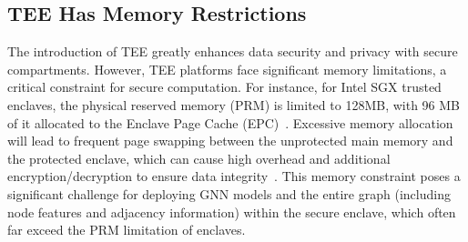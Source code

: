 \subsection{TEE Has Memory Restrictions} \label{ps: TEE}
The introduction of TEE greatly enhances data security and privacy with secure compartments. 
However, TEE platforms face significant memory limitations, a critical constraint for secure computation. 
For instance, for Intel SGX trusted enclaves, the physical reserved memory (PRM) is limited to 128MB, with 96 MB of it allocated to the Enclave Page Cache (EPC)~\cite{intel2017sgx}. 
Excessive memory allocation will lead to frequent page swapping between the unprotected main memory and the protected enclave, which can cause high overhead and additional encryption/decryption to ensure data integrity~\cite{costan2016intel}.
This memory constraint poses a significant challenge for deploying GNN models and the entire graph (including node features and adjacency information) within the secure enclave, which often far exceed the PRM limitation of enclaves.

